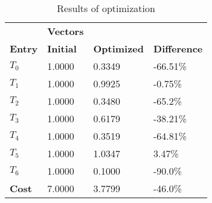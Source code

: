 \begin{table}[h!]
\centering
\begin{tabular}{llll}
\textbf{}      & \cellcolor[HTML]{EFEFEF}\textbf{Vectors} & \textbf{} & \textbf{}         \\
\rowcolor[HTML]{EFEFEF} 
\textbf{Entry} & \textbf{Initial} & \textbf{Optimized} & \textbf{Difference} \\
$T_0$ & 1.0000 & 0.3349 & -66.51\% \\ 
$T_1$ & 1.0000 & 0.9925 & -0.75\% \\ 
$T_2$ & 1.0000 & 0.3480 & -65.2\% \\ 
$T_3$ & 1.0000 & 0.6179 & -38.21\% \\ 
$T_4$ & 1.0000 & 0.3519 & -64.81\% \\ 
$T_5$ & 1.0000 & 1.0347 & 3.47\% \\ 
$T_6$ & 1.0000 & 0.1000 & -90.0\% \\ 
\rowcolor[HTML]{EFEFEF} 
\textbf{Cost}  & 7.0000 & 3.7799 & -46.0\% \\ 
\end{tabular}
\caption{Results of optimization}
\label{tab:OptimizationAnalysis}
\end{table}
